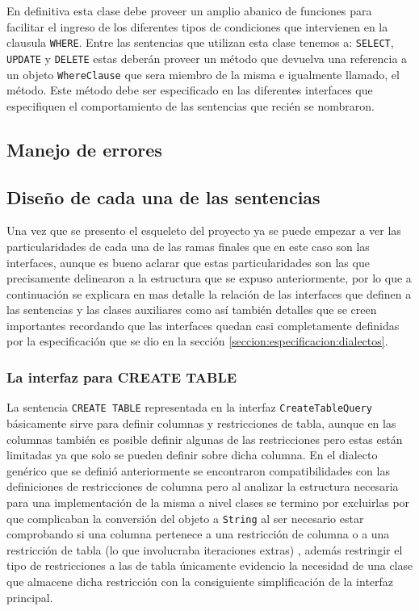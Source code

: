En definitiva esta clase debe proveer un amplio abanico de funciones para facilitar el ingreso de los diferentes tipos de condiciones que intervienen en la clausula \verb=WHERE=. Entre las sentencias que utilizan esta clase tenemos a: \verb=SELECT=, \verb=UPDATE= y \verb=DELETE= estas deberán proveer un método que devuelva una referencia a un objeto \verb=WhereClause= que sera miembro de la misma e igualmente llamado, el método. Este método debe ser especificado en las diferentes interfaces que especifiquen el comportamiento de las sentencias que recién se nombraron. 

\subsection{Manejo de errores}

\subsection{Diseño de cada una de las sentencias}
Una vez que se presento el esqueleto del proyecto ya se puede empezar a ver las particularidades de cada una de las ramas finales que en este caso son las interfaces, aunque es bueno aclarar que estas particularidades son las que precisamente delinearon a la estructura que se expuso anteriormente, por lo que a continuación se explicara en mas detalle la relación de las interfaces que definen a las sentencias y las clases auxiliares como así también detalles que se creen importantes recordando que las interfaces quedan casi completamente definidas por la especificación que se dio en la sección \ref{seccion:especificacion:dialectos}.

\subsubsection{La interfaz para CREATE TABLE}
La sentencia \verb=CREATE TABLE= representada en la interfaz \verb=CreateTableQuery= básicamente sirve para definir columnas y restricciones de tabla, aunque en las columnas también es posible definir algunas de las restricciones pero estas están limitadas ya que solo se pueden definir sobre dicha columna. En el dialecto genérico que se definió anteriormente se encontraron compatibilidades con las definiciones de restricciones de columna pero al analizar la estructura necesaria para una implementación de la misma a nivel clases se termino por excluirlas por que complicaban la conversión del objeto a \verb=String= al ser necesario estar comprobando si una columna pertenece a una restricción de columna o a una restricción de tabla (lo que involucraba iteraciones extras) , además restringir el tipo de restricciones a las de tabla únicamente evidencio la  necesidad de una clase que almacene dicha restricción con la consiguiente simplificación de la interfaz principal.


